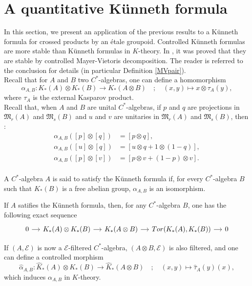\section{A quantitative Künneth formula}

In this section, we present an application of the previous results to a Künneth formula for crossed products by an étale groupoid. Controlled Künneth formulas are more stable than Künneth formulas in $K$-theory. In \cite{OY4}, it was proved that they are stable by controlled Mayer-Vietoris decomposition. The reader is referred to the conclusion for details (in particular Definition \ref{MVpair}). \\ 

Recall that for $A$ and $B$ two $C^*$-algebras, one can define a homomorphism
\[\alpha_{A,B} : K_*(A)\otimes K_*(B)\rightarrow K_*(A\otimes B) \quad ; \quad (x,y)\mapsto x\otimes   \tau_A(y),\]
where $\tau_A$ is the external Kasparov product.\\

Recall that, when $A$ and $B$ are unital $C^*$-algebras, if $p$ and $q$ are projections in $\mathfrak M_r(A)$ and $\mathfrak M_s(B)$ and $u$ and $v$ are unitaries in $\mathfrak M_r(A)$ and $\mathfrak M_s(B)$, then :
\[\begin{array}{rl}
\alpha_{A,B}([p]\otimes [q]) & = [p\otimes q], \\
\alpha_{A,B}([u]\otimes [q]) & = [u \otimes q +1\otimes (1-q)], \\
\alpha_{A,B}([p]\otimes [v]) & = [p\otimes v +(1-p)\otimes v] .\\
\end{array}\]

\begin{definition}
A $C^*$-algebra $A$ is said to satisfy the Künneth formula if, for every $C^*$-algebra $B$ such that $K_*(B)$ is a free abelian group, $\alpha_{A,B}$ is an isomorphism.
\end{definition}

If $A$ satifies the Künneth formula, then, for any $C^*$-algebra $B$, one has the following exact sequence
\[\begin{tikzcd}[column sep = small] 0 \arrow{r} & K_*(A)\otimes K_*(B)\arrow{r} & K_*(A\otimes B) \arrow{r} & Tor(K_*(A),K_*(B))\arrow{r} & 0 \end{tikzcd}\]

If $(A,\mathcal E)$ is now a $\mathcal E$-filtered $C^*$-algebra, $(A\otimes B,\mathcal E)$ is also filtered, and one can define a controlled morphism
\[\hat\alpha_{A,B} : \hat K_*(A)\otimes K_*(B)\rightarrow \hat K_*(A\otimes B) \quad ; \quad (x,y)\mapsto \hat\tau_A(y)(x),\]
which induces $\alpha_{A,B}$ in $K$-theory. \\

